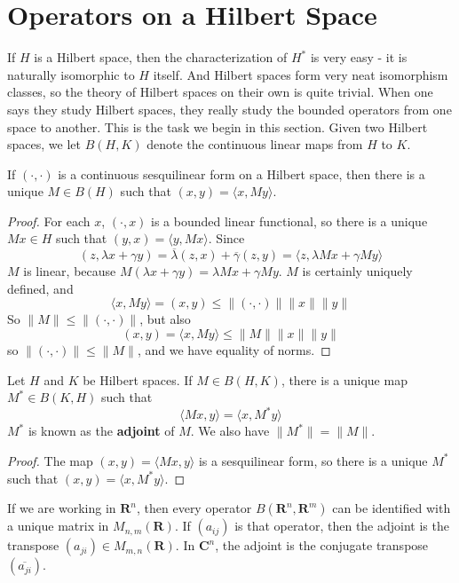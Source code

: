 \section{Operators on a Hilbert Space}

If $H$ is a Hilbert space, then the characterization of $H^*$ is very easy - it is naturally isomorphic to $H$ itself. And Hilbert spaces form very neat isomorphism classes, so the theory of Hilbert spaces on their own is quite trivial. When one says they study Hilbert spaces, they really study the bounded operators from one space to another. This is the task we begin in this section. Given two Hilbert spaces, we let $B(H,K)$ denote the continuous linear maps from $H$ to $K$.

\begin{lemma}
    If $( \cdot, \cdot )$ is a continuous sesquilinear form on a Hilbert space, then there is a unique $M \in B(H)$ such that $(x,y) = \langle x, My \rangle$.
\end{lemma}
\begin{proof}
    For each $x$, $(\cdot, x)$ is a bounded linear functional, so there is a unique $Mx \in H$ such that $(y,x) = \langle y, Mx \rangle$. Since
    \[ (z, \lambda x + \gamma y) = \overline{\lambda}(z, x) + \overline{\gamma}(z,y) = \langle z, \lambda Mx + \gamma My \rangle \]
    $M$ is linear, because $M(\lambda x + \gamma y) = \lambda Mx + \gamma My$. $M$ is certainly uniquely defined, and
    \[ \langle x, My \rangle = (x,y) \leq \|(\cdot, \cdot)\| \| x \| \| y \| \]
    So $\| M \| \leq \|(\cdot,\cdot)\|$, but also
    \[ (x,y) = \langle x, My \rangle \leq \| M \| \| x \| \| y \| \]
    so $\|(\cdot, \cdot)\| \leq \| M \|$, and we have equality of norms.
\end{proof}

\begin{theorem}
    Let $H$ and $K$ be Hilbert spaces. If $M \in B(H,K)$, there is a unique map $M^* \in B(K,H)$ such that
    \[ \langle Mx, y \rangle = \langle x, M^*y \rangle \]
    $M^*$ is known as the {\bf adjoint} of $M$. We also have $\| M^* \| = \| M \|$.
\end{theorem}
\begin{proof}
    The map $(x,y) = \langle Mx, y \rangle$ is a sesquilinear form, so there is a unique $M^*$ such that $(x,y) = \langle x, M^*y \rangle$.
\end{proof}

\begin{example}
    If we are working in $\mathbf{R}^n$, then every operator $B(\mathbf{R}^n, \mathbf{R}^m)$ can be identified with a unique matrix in $M_{n,m}(\mathbf{R})$. If $(a_{ij})$ is that operator, then the adjoint is the transpose $(a_{ji}) \in M_{m,n}(\mathbf{R})$. In $\mathbf{C}^n$, the adjoint is the conjugate transpose $(\overline{a_{ji}})$.
\end{example}

